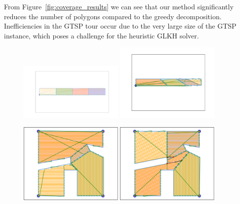\documentclass[../main.tex]{subfiles}
\begin{document}
From Figure~\ref{fig:coverage_results} we can see that our method significantly reduces the number of polygons compared to the greedy decomposition. Inefficiencies in the GTSP tour occur due to the very large size of the GTSP instance, which poses a challenge for the heuristic GLKH solver.



\begin{figure}
		\centering
		\includegraphics[width=0.45\textwidth]{img/chapter_5/ID_1_orig.pdf}%
		\includegraphics[width=0.45\textwidth]{img/chapter_5/ID_1_reopt.pdf}

		\includegraphics[width=0.45\textwidth]{img/chapter_5/ID_2_orig.pdf}%
		\includegraphics[width=0.45\textwidth]{img/chapter_5/ID_2_reopt.pdf}


\end{figure}
\end{document}
